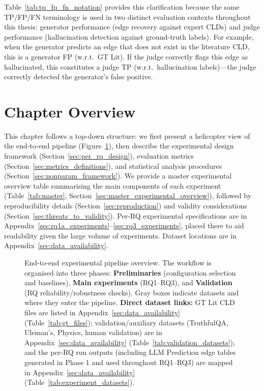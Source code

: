 \noindent Table~\ref{tab:tp_fp_fn_notation} provides this clarification because the same TP/FP/FN terminology is used in two distinct evaluation contexts throughout this thesis: generator performance (edge recovery against expert CLDs) and judge performance (hallucination detection against ground-truth labels). For example, when the generator predicts an edge that does not exist in the literature CLD, this is a generator FP (w.r.t.\ GT Lit). If the judge correctly flags this edge as hallucinated, this constitutes a judge TP (w.r.t.\ hallucination labels)---the judge correctly detected the generator's false positive.

\section{Chapter Overview}
\label{sec:exp_chapter_overview}

This chapter follows a top-down structure: we first present a helicopter view of the end-to-end pipeline (Figure~\ref{fig:experimental_pipeline_overview}), then describe the experimental design framework (Section~\ref{sec:per_rq_design}), evaluation metrics (Section~\ref{sec:metrics_definitions}), and statistical analysis procedures (Section~\ref{sec:nonparam_framework}). We provide a master experimental overview table summarising the main components of each experiment (Table~\ref{tab:master}, Section~\ref{sec:master_experimental_overview}), followed by reproducibility details (Section~\ref{sec:reproduction}) and validity considerations (Section~\ref{sec:threats_to_validity}). Per-RQ experimental specifications are in Appendix~\ref{sec:rq1a_experiments}--\ref{sec:rq3_experiments}, placed there to aid readability given the large volume of experiments. Dataset locations are in Appendix~\ref{sec:data_availability}.

\begin{figure}[H]
\centering
\resizebox{1.0\textwidth}{!}{%

}
\caption[End-to-end experimental pipeline overview.]{End-to-end experimental pipeline overview. The workflow is organised into three phases: \textbf{Preliminaries} (configuration selection and baselines), \textbf{Main experiments} (RQ1--RQ3), and \textbf{Validation} (RQ reliability/robustness checks). Gray boxes indicate datasets and where they enter the pipeline. \textbf{Direct dataset links:} GT Lit CLD files are listed in Appendix~\ref{sec:data_availability} (Table~\ref{tab:gt_files}); validation/auxiliary datasets (TruthfulQA, Uleman's, Physics, human validation) are in Appendix~\ref{sec:data_availability} (Table~\ref{tab:validation_datasets}); and the per-RQ run outputs (including LLM Prediction edge tables generated in Phase 1 and used throughout RQ1--RQ3) are mapped in Appendix~\ref{sec:data_availability} (Table~\ref{tab:experiment_datasets}).}
\label{fig:experimental_pipeline_overview}
\end{figure}

